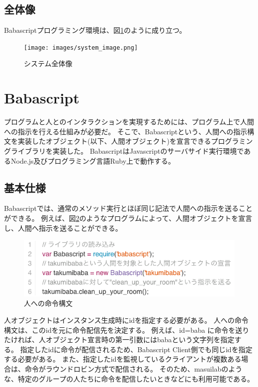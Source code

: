 \subsection{全体像}\label{ux5168ux4f53ux50cf}

Babascriptプログラミング環境は、図\ref{fig:system_image}のように成り立つ。

\begin{figure}[htbp]
  \begin{center}
  \texttt{[image: images/system\_image.png]}
  \end{center}
  \caption{システム全体像}
  \label{fig:system_image}
\end{figure}

\section{Babascript}\label{babascript}

プログラムと人とのインタラクションを実現するためには、プログラム上で人間への指示を行える仕組みが必要だ。
そこで、Babascriptという、人間への指示構文を実装したオブジェクト(以下、人間オブジェクト)を宣言できるプログラミングライブラリを実装した。
BabascriptはJavascriptのサーバサイド実行環境であるNode.js及びプログラミング言語Ruby上で動作する。

\subsection{基本仕様}\label{ux57faux672cux4ed5ux69d8}

Babascriptでは、通常のメソッド実行とほぼ同じ記法で人間への指示を送ることができる。
例えば、図\ref{fig:babascript_sample}のようなプログラムによって、人間オブジェクトを宣言し、人間へ指示を送ることができる。

\begin{figure}[htbp]
  \begin{center}
  \includegraphics[width=.8\linewidth,bb=0 0 563 151]{images/babascript_sample.js.png}
  \end{center}
  \caption{人への命令構文}
  \label{fig:babascript_sample}
\end{figure}

人オブジェクトはインスタンス生成時にidを指定する必要がある。
人への命令構文は、このidを元に命令配信先を決定する。 例えば、id=baba
に命令を送りたければ、人オブジェクト宣言時の第一引数にはbabaという文字列を指定する。
指定したidに命令が配信されるため、Babascript
Client側でも同じidを指定する必要がある。
また、指定したidを監視しているクライアントが複数ある場合は、命令がラウンドロビン方式で配信される。
そのため、masuilabのような、特定のグループの人たちに命令を配信したいときなどにも利用可能である。

